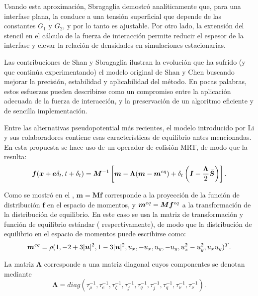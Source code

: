 Usando esta aproximaci\'on, Sbragaglia demostr\'o anal\'iticamente que, para una interfase plana, la  conduce a una tensi\'on superficial que depende de las constantes $G_1$ y $G_2$, y por lo tanto es ajustable. Por otro lado, la extensi\'on del stencil en el c\'alculo de la fuerza de interacci\'on permite reducir el espesor de la interfase y elevar la relaci\'on de densidades en simulaciones estacionarias.


Las contribuciones de Shan y Sbragaglia ilustran la evoluci\'on que ha sufrido (y que contin\'ua experimentando) el modelo original de Shan y Chen buscando mejorar la precisi\'on, estabilidad y aplicabilidad del m\'etodo. En pocas palabras, estos esfuerzos pueden describirse como un compromiso entre la aplicaci\'on adecuada de la fuerza de interacci\'on, y la preservaci\'on de un algoritmo eficiente y de sencilla implementaci\'on.

Entre las alternativas pseudopotential m\'as recientes, el modelo introducido por Li y sus colaboradores \cite{li_lattice_2013} contiene esas caracter\'isticas de equilibrio antes mencionadas. En esta propuesta se hace uso de un operador de colisi\'on MRT, de modo que la \lbe{} resulta:
\begin{equation}
	\bm{f} (\bm{x} + \bm{e}\delta_t, t+\delta_t) = \bm{M}^{-1}\left[ \bm{m} - \bm{\Lambda}(\bm{m} - \bm{m}^{eq})  + \delta_t \left( \bm{I} - \dfrac{\bm{\Lambda}}{2} \bar{\bm{S}} \right) \right].
	\label{eq:lbe_li}
\end{equation}

Como se mostr\'o en el , $\bm{m} = \bm{Mf}$ corresponde a la proyecci\'on de la funci\'on de distribuci\'on $\bm{f}$ en el espacio de momentos, y $\bm{m}^{eq} = \bm{M}\bm{f}^{eq}$ a la transformaci\'on de la distribuci\'on de equilibrio. En este caso se usa la matriz de transformaci\'on y funci\'on de equilibrio est\'andar ( respectivamente), de modo que la distribuci\'on de equilibrio en el espacio de momentos puede escribirse como:
\begin{equation}
\bm{m}^{eq} = \rho (1, -2+3|\bm{u}|^2, 1-3|\bm{u}|^2, u_x, -u_x, u_y, -u_y, u_x^2-u_y^2, u_xu_y)^T.
\label{eq:feq_li}
\end{equation}

La matriz $\bm{\Lambda}$ corresponde a una matriz diagonal cuyos componentes se denotan mediante
\begin{equation}
	\bm{\Lambda}=diag(\tau_{\rho}^{-1},\tau_{e}^{-1},\tau_{\zeta}^{-1},\tau_{j}^{-1},\tau_{q}^{-1},\tau_{j}^{-1},\tau_{q}^{-1},\tau_{\nu}^{-1},\tau_{\nu}^{-1}).
\end{equation}

